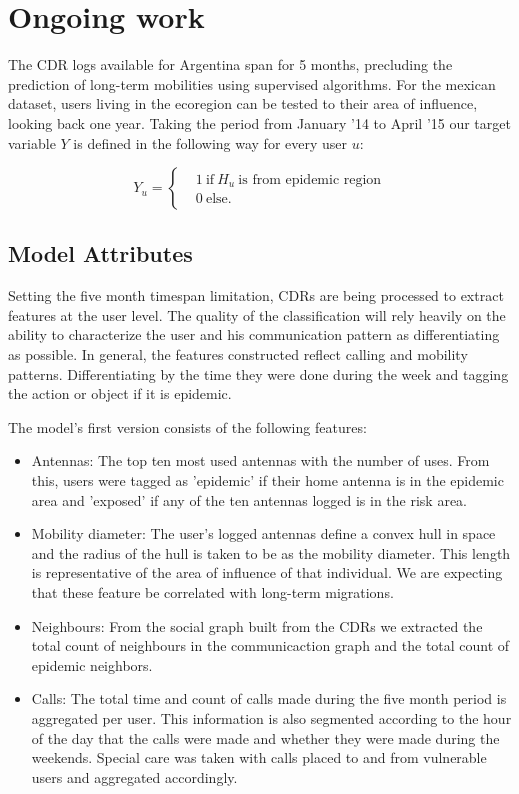 \section{Ongoing work}

The CDR logs available for Argentina span for 5 months, precluding the prediction of long-term mobilities using supervised algorithms. For the mexican dataset, users living in the ecoregion can be tested to their area of influence, looking back one year. Taking the period from January '14 to April '15 our target variable $Y $ is defined in the following way for every user $u$: 

\[
    Y_u =
      \begin{cases}
        &1 \ \mbox{if} \ H_u \ \mbox{is from epidemic region}\\
        &0 \ \mbox{else}.
      \end{cases}
    \]
    
\subsection{Model Attributes}

Setting the five month timespan limitation, CDRs are being processed to extract features at the user level. The quality of the classification will rely heavily on the ability to characterize the user and his communication pattern as differentiating as possible. In general, the features constructed reflect calling and mobility patterns. Differentiating by the time they were done during the week and tagging the action or object if it is epidemic. 

The model's first version consists of the following features:

\begin{itemize}
    \item Antennas: The top ten most used antennas with the number of uses. From this, users were tagged as 'epidemic' if their home antenna is in the epidemic area and 'exposed' if any of the ten antennas logged is in the risk area.
    \item Mobility diameter: The user's logged antennas define a convex hull in space and the radius of the hull is taken to be as the mobility diameter. This length is representative of the area of influence of that individual. We are expecting that these feature be correlated with long-term migrations.
    \item Neighbours: From the social graph built from the CDRs we extracted the total count of neighbours in the communicaction graph and the total count of epidemic neighbors. 
    \item Calls: The total time and count of calls made during the five month period is aggregated per user. This information is also segmented according to the hour of the day that the calls were made and whether they were made during the weekends. Special care was taken with calls placed to and from vulnerable users and aggregated accordingly.
\end{itemize}


